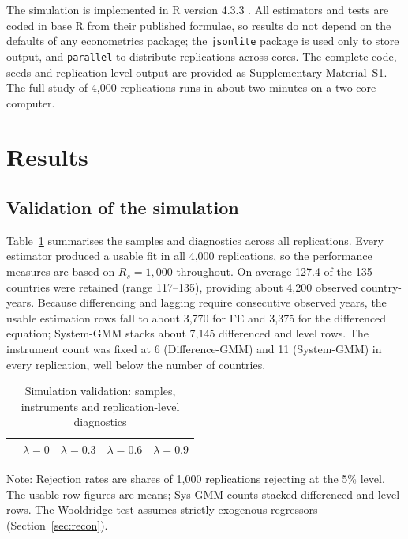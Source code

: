 \documentclass[11pt,a4paper]{article}
\begin{document}
The simulation is implemented in R version 4.3.3 \citep{RCore2024}. All estimators and tests are coded in base R from their published formulae, so results do not depend on the defaults of any econometrics package; the \texttt{jsonlite} package \citep{Ooms2014} is used only to store output, and \texttt{parallel} to distribute replications across cores. The complete code, seeds and replication-level output are provided as Supplementary Material~S1. The full study of 4{,}000 replications runs in about two minutes on a two-core computer.

\section{Results}\label{sec:results}

\subsection{Validation of the simulation}\label{sec:valid}

Table~\ref{tab:valid} summarises the samples and diagnostics across all replications. Every estimator produced a usable fit in all 4{,}000 replications, so the performance measures are based on $R_s=1{,}000$ throughout. On average 127.4 of the 135 countries were retained (range 117--135), providing about 4{,}200 observed country-years. Because differencing and lagging require consecutive observed years, the usable estimation rows fall to about 3{,}770 for FE and 3{,}375 for the differenced equation; System-GMM stacks about 7{,}145 differenced and level rows. The instrument count was fixed at 6 (Difference-GMM) and 11 (System-GMM) in every replication, well below the number of countries.

\begin{table}[htbp]
\centering
\begin{threeparttable}
\caption{Simulation validation: samples, instruments and replication-level diagnostics}\label{tab:valid}
\scriptsize
\setlength{\tabcolsep}{3pt}
\begin{tabular}{@{}p{5.3cm}cccc@{}}
\toprule
 & $\lambda=0$ & $\lambda=0.3$ & $\lambda=0.6$ & $\lambda=0.9$ \\
\midrule
\bottomrule
\end{tabular}
\begin{tablenotes}\footnotesize
\item Note: Rejection rates are shares of 1{,}000 replications rejecting at the 5\% level. The usable-row figures are means; Sys-GMM counts stacked differenced and level rows. The Wooldridge test assumes strictly exogenous regressors (Section~\ref{sec:recon}).
\end{tablenotes}
\end{threeparttable}
\end{table}
\end{document}
